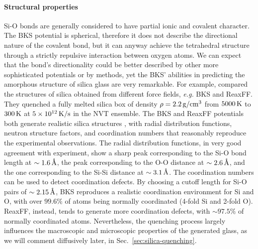 \paragraph{Structural properties}
Si-O bonds are generally considered to have partial ionic and covalent character. The BKS potential is spherical, therefore it does not describe the directional nature of the covalent bond, but it can anyway achieve the tetrahedral structure through a strictly repulsive interaction between oxygen atoms. We can expect that the bond's directionality could be better described by other more sophisticated potentials or by \abinitio methods, yet the BKS' abilities in predicting the amorphous structure of silica glass are very remarkable. 
For example, \textcite{Tian2017} compared the structures of silica obtained from different force fields, \emph{e.g.} BKS and ReaxFF. They quenched a fully melted silica box of density $\rho=2.2\,\mathrm{g/cm^3}$ from $5000\,\mathrm{K}$ to $300\,\mathrm{K}$ at $5\times 10^{12}\,\mathrm{K/s}$ in the NVT ensemble. 
The BKS and ReaxFF potentials both generate realistic silica structures \cite{Vollmayr1996,Yuan2001}, with radial distribution functions, neutron structure factors, and coordination numbers that reasonably reproduce the experimental observations.
The radial distribution functions, in very good agreement with experiment, show a sharp peak corresponding to the Si-O bond length at $\sim 1.6\,\mathrm{{\mbox{\AA}}}$, the peak corresponding to the O-O distance at $\sim 2.6\,\mathrm{{\mbox{\AA}}}$, and the one corresponding to the Si-Si distance at $\sim 3.1\,\mathrm{{\mbox{\AA}}}$. 
The coordination numbers can be used to detect coordination defects. By choosing a cutoff length for Si-O pairs of $\sim 2.15\,\mathrm{{\mbox{\AA}}}$, BKS reproduces a realistic coordination environment for Si and O, with over $99.6\%$ of atoms being normally coordinated (4-fold Si and 2-fold O). ReaxFF, instead, tends to generate more coordination defects, with $\sim 97.5\%$ of normally coordinated atoms.
Nevertheless, the quenching process largely influences the macroscopic and microscopic properties of the generated glass, as we will comment diffusively later, in Sec.~\ref{sec:silica-quenching}. 


